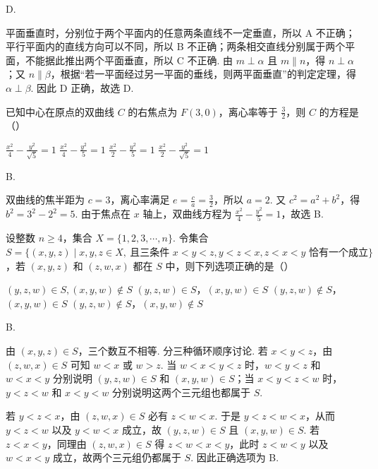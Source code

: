 \begin{answer}
D.
\end{answer}

\begin{solution}
平面垂直时，分别位于两个平面内的任意两条直线不一定垂直，所以 A 不正确；平行平面内的直线方向可以不同，所以 B 不正确；两条相交直线分别属于两个平面，不能据此推出两个平面垂直，所以 C 不正确. 由 \(m\perp\alpha\) 且 \(m\parallel n\)，得 \(n\perp\alpha\)；又 \(n\parallel\beta\)，根据“若一平面经过另一平面的垂线，则两平面垂直”的判定定理，得 \(\alpha\perp\beta\). 因此 D 正确，故选 D.
\end{solution}

\begin{problem}
已知中心在原点的双曲线 \(C\) 的右焦点为 \(F(3,0)\)，离心率等于 \(\frac{3}{2}\)，则 \(C\) 的方程是（\quad）

\choices
    {\(\frac{x^2}{4} -\frac{y^2}{\sqrt{5}} = 1\)}
    {\(\frac{x^2}{4} -\frac{y^2}{5} = 1\)}
    {\(\frac{x^2}{2} -\frac{y^2}{5} = 1\)}
    {\(\frac{x^2}{2} -\frac{y^2}{\sqrt{5}} = 1\)}
\end{problem}

\begin{answer}
B.
\end{answer}

\begin{solution}
双曲线的焦半距为 \(c=3\)，离心率满足 \(e=\frac ca=\frac32\)，所以 \(a=2\). 又 \(c^2=a^2+b^2\)，得 \(b^2=3^2-2^2=5\). 由于焦点在 \(x\) 轴上，双曲线方程为 \(\frac{x^2}{4}-\frac{y^2}{5}=1\)，故选 B.
\end{solution}

\begin{problem}
设整数 \(n \geqslant 4\)，集合 \(X = \{1, 2, 3, \cdots, n\}\).
令集合 \(S = \{(x, y, z) \mid x, y, z \in X,\ \text{且三条件 } x < y < z, y < z < x, z < x < y \text{ 恰有一个成立}\}\)，若 \((x, y, z)\) 和 \((z, w, x)\) 都在 \(S\) 中，则下列选项正确的是（\quad）

\choices
    {\((y, z, w) \in S, (x, y, w) \notin S\)}
    {\((y, z, w) \in S\)，\((x, y, w) \in S\)}
    {\((y,z,w)\notin S\)，\((x,y,w)\in S\)}
    {\((y,z,w)\notin S\)，\((x,y,w)\notin S\)}
\end{problem}

\begin{answer}
B.
\end{answer}

\begin{solution}
由 \((x,y,z)\in S\)，三个数互不相等. 分三种循环顺序讨论. 若 \(x<y<z\)，由 \((z,w,x)\in S\) 可知 \(w<x\) 或 \(w>z\). 当 \(w<x<y<z\) 时，\(w<y<z\) 和 \(w<x<y\) 分别说明 \((y,z,w)\in S\) 和 \((x,y,w)\in S\)；当 \(x<y<z<w\) 时，\(y<z<w\) 和 \(x<y<w\) 分别说明这两个三元组也都属于 \(S\).

若 \(y<z<x\)，由 \((z,w,x)\in S\) 必有 \(z<w<x\). 于是 \(y<z<w<x\)，从而 \(y<z<w\) 以及 \(y<w<x\) 成立，故 \((y,z,w)\in S\) 且 \((x,y,w)\in S\). 若 \(z<x<y\)，同理由 \((z,w,x)\in S\) 得 \(z<w<x<y\)，此时 \(z<w<y\) 以及 \(w<x<y\) 成立，故两个三元组仍都属于 \(S\). 因此正确选项为 B.
\end{solution}

